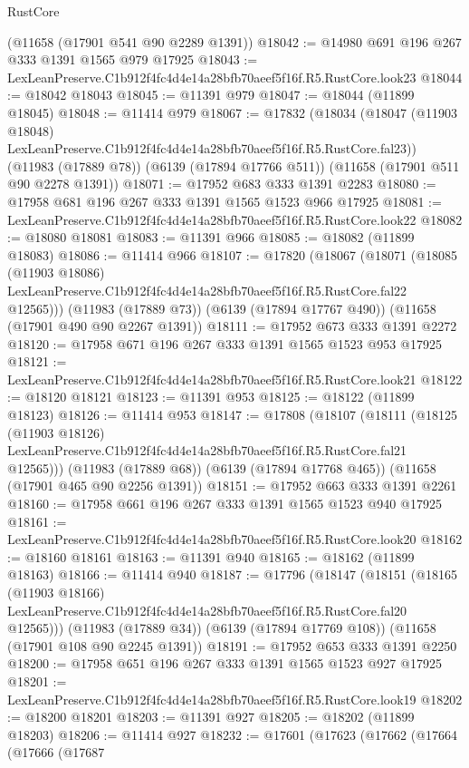 \begin{lexlean}{RustCore}
\begin{coremodule}
    (@11658 (@17901 @541 @90 @2289 @1391))
@18042 := @14980 @691 @196 @267 @333 @1391 @1565 @979 @17925
@18043 := LexLeanPreserve.C1b912f4fc4d4e14a28bfb70aeef5f16f.R5.RustCore.look23
@18044 := @18042 @18043
@18045 := @11391 @979
@18047 := @18044 (@11899 @18045)
@18048 := @11414 @979
@18067 := @17832
    (@18034
      (@18047 (@11903 @18048) LexLeanPreserve.C1b912f4fc4d4e14a28bfb70aeef5f16f.R5.RustCore.fal23))
    (@11983 (@17889 @78))
    (@6139 (@17894 @17766 @511))
    (@11658 (@17901 @511 @90 @2278 @1391))
@18071 := @17952 @683 @333 @1391 @2283
@18080 := @17958 @681 @196 @267 @333 @1391 @1565 @1523 @966 @17925
@18081 := LexLeanPreserve.C1b912f4fc4d4e14a28bfb70aeef5f16f.R5.RustCore.look22
@18082 := @18080 @18081
@18083 := @11391 @966
@18085 := @18082 (@11899 @18083)
@18086 := @11414 @966
@18107 := @17820
    (@18067
      (@18071
        (@18085
          (@11903 @18086)
          LexLeanPreserve.C1b912f4fc4d4e14a28bfb70aeef5f16f.R5.RustCore.fal22
          @12565)))
    (@11983 (@17889 @73))
    (@6139 (@17894 @17767 @490))
    (@11658 (@17901 @490 @90 @2267 @1391))
@18111 := @17952 @673 @333 @1391 @2272
@18120 := @17958 @671 @196 @267 @333 @1391 @1565 @1523 @953 @17925
@18121 := LexLeanPreserve.C1b912f4fc4d4e14a28bfb70aeef5f16f.R5.RustCore.look21
@18122 := @18120 @18121
@18123 := @11391 @953
@18125 := @18122 (@11899 @18123)
@18126 := @11414 @953
@18147 := @17808
    (@18107
      (@18111
        (@18125
          (@11903 @18126)
          LexLeanPreserve.C1b912f4fc4d4e14a28bfb70aeef5f16f.R5.RustCore.fal21
          @12565)))
    (@11983 (@17889 @68))
    (@6139 (@17894 @17768 @465))
    (@11658 (@17901 @465 @90 @2256 @1391))
@18151 := @17952 @663 @333 @1391 @2261
@18160 := @17958 @661 @196 @267 @333 @1391 @1565 @1523 @940 @17925
@18161 := LexLeanPreserve.C1b912f4fc4d4e14a28bfb70aeef5f16f.R5.RustCore.look20
@18162 := @18160 @18161
@18163 := @11391 @940
@18165 := @18162 (@11899 @18163)
@18166 := @11414 @940
@18187 := @17796
    (@18147
      (@18151
        (@18165
          (@11903 @18166)
          LexLeanPreserve.C1b912f4fc4d4e14a28bfb70aeef5f16f.R5.RustCore.fal20
          @12565)))
    (@11983 (@17889 @34))
    (@6139 (@17894 @17769 @108))
    (@11658 (@17901 @108 @90 @2245 @1391))
@18191 := @17952 @653 @333 @1391 @2250
@18200 := @17958 @651 @196 @267 @333 @1391 @1565 @1523 @927 @17925
@18201 := LexLeanPreserve.C1b912f4fc4d4e14a28bfb70aeef5f16f.R5.RustCore.look19
@18202 := @18200 @18201
@18203 := @11391 @927
@18205 := @18202 (@11899 @18203)
@18206 := @11414 @927
@18232 := @17601
    (@17623
      (@17662
        (@17664
          (@17666
            (@17687

\end{coremodule}
\end{lexlean}
